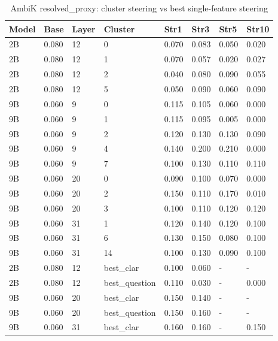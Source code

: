 \begin{table}[t]
\centering
\caption{AmbiK resolved_proxy: cluster steering vs best single-feature steering}
\label{tab:cluster_vs_single_strength}
\begin{tabular}{llllllll}
\toprule
Model & Base & Layer & Cluster & Str1 & Str3 & Str5 & Str10 \\
\midrule
2B & 0.080 & 12 & 0 & 0.070 & 0.083 & 0.050 & 0.020 \\
2B & 0.080 & 12 & 1 & 0.070 & 0.057 & 0.020 & 0.027 \\
2B & 0.080 & 12 & 2 & 0.040 & 0.080 & 0.090 & 0.055 \\
2B & 0.080 & 12 & 5 & 0.050 & 0.090 & 0.060 & 0.090 \\
9B & 0.060 & 9 & 0 & 0.115 & 0.105 & 0.060 & 0.000 \\
9B & 0.060 & 9 & 1 & 0.115 & 0.095 & 0.005 & 0.000 \\
9B & 0.060 & 9 & 2 & 0.120 & 0.130 & 0.130 & 0.090 \\
9B & 0.060 & 9 & 4 & 0.140 & 0.200 & 0.210 & 0.000 \\
9B & 0.060 & 9 & 7 & 0.100 & 0.130 & 0.110 & 0.110 \\
9B & 0.060 & 20 & 0 & 0.090 & 0.100 & 0.070 & 0.000 \\
9B & 0.060 & 20 & 2 & 0.150 & 0.110 & 0.170 & 0.010 \\
9B & 0.060 & 20 & 3 & 0.100 & 0.110 & 0.120 & 0.120 \\
9B & 0.060 & 31 & 1 & 0.120 & 0.140 & 0.120 & 0.100 \\
9B & 0.060 & 31 & 6 & 0.130 & 0.150 & 0.080 & 0.100 \\
9B & 0.060 & 31 & 14 & 0.100 & 0.130 & 0.090 & 0.100 \\
2B & 0.080 & 12 & best_clar & 0.100 & 0.060 & - & - \\
2B & 0.080 & 12 & best_question & 0.110 & 0.030 & - & 0.000 \\
9B & 0.060 & 20 & best_clar & 0.150 & 0.140 & - & - \\
9B & 0.060 & 20 & best_question & 0.150 & 0.160 & - & - \\
9B & 0.060 & 31 & best_clar & 0.160 & 0.160 & - & 0.150 \\
\bottomrule
\end{tabular}
\end{table}

